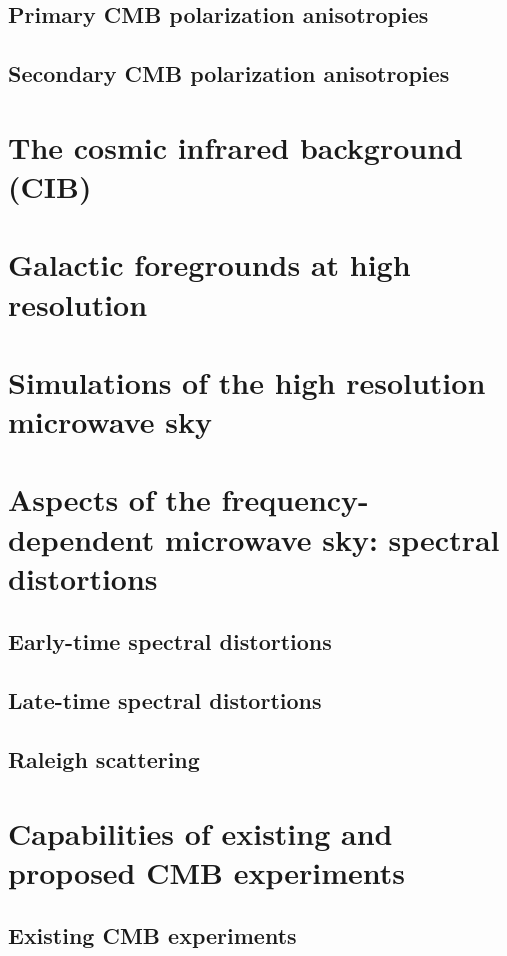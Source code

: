 \documentclass[aps,nofootinbib,groupedaddress]{revtex4}
\begin{document}
\subsection{Primary CMB polarization anisotropies}

\subsection{Secondary CMB polarization anisotropies}

\section{The cosmic infrared background (CIB)}

\section{Galactic foregrounds at high resolution}

\section{Simulations of the high resolution microwave sky}

\section{Aspects of the frequency-dependent microwave sky: spectral distortions}

\subsection{Early-time spectral distortions}

\subsection{Late-time spectral distortions}

\subsection{Raleigh scattering}

\section{Capabilities of existing and proposed CMB experiments}

\subsection{Existing CMB experiments}
\end{document}
